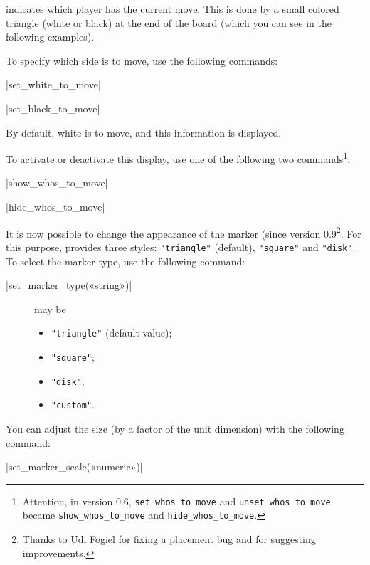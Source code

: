 \documentclass[english]{ltxdoc}
\begin{document}
\mpchess indicates which player has the current move. This is done by
a small colored triangle (white or black) at the end of the board (which
you can see in the following examples).

To specify which side is to move, use the following commands:

\commande|set_white_to_move|\smallskip


\commande|set_black_to_move|\smallskip

By default, white is to move, and this information is displayed.

To activate or deactivate this display, use one of the following two
commands\footnote{Attention,
in version 0.6, \lstinline+set_whos_to_move+ and
\lstinline+unset_whos_to_move+ became \lstinline+show_whos_to_move+ and
\lstinline+hide_whos_to_move+.}:

\commande|show_whos_to_move|\smallskip


\commande|hide_whos_to_move|\smallskip

It is now possible to change the appearance of the marker (since
version 0.9\footnote{Thanks to Udi Fogiel for fixing a placement bug and
for suggesting improvements.}. For this purpose, \mpchess provides three styles:
\lstinline+"triangle"+ (default), \lstinline+"square"+ and \lstinline+"disk"+.
To select the marker type, use the following command:

\commande|set_marker_type(«string»)|\smallskip

\begin{description}
  \item[] may be
\begin{itemize}
  \item \lstinline+"triangle"+ (default value);
  \item \lstinline+"square"+;
\item \lstinline+"disk"+;
\item \lstinline+"custom"+.
\end{itemize}
\end{description}

You can adjust the size (by a factor of the unit dimension) with the following
command: 

\commande|set_marker_scale(«numeric»)|\smallskip
\end{document}
